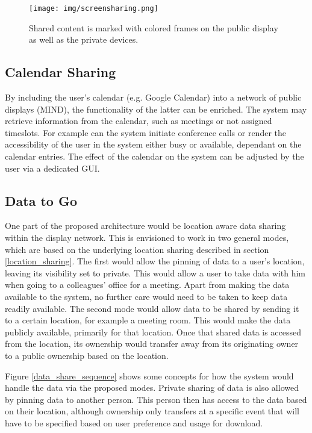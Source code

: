 \begin{figure}
	\centering
	\texttt{[image: img/screensharing.png]}
	\caption[Screen Sharing]{Shared content is marked with colored frames on the public display as well as the private devices.}
	\label{screen_sharing}
\end{figure}

\subsection{Calendar Sharing}

By including the user’s calendar (e.g. Google Calendar) into a network of public displays (MIND), the functionality of the latter can be enriched.
The system may retrieve information from the calendar, such as meetings or not assigned timeslots.
For example can the system initiate conference calls or render the accessibility of the user in the system either busy or available, dependant on the calendar entries.
The effect of the calendar on the system can be adjusted by the user via a dedicated GUI.

\subsection{Data to Go}
\label{data2go}

One part of the proposed architecture would be location aware data sharing within the display network.
This is envisioned to work in two general modes, which are based on the underlying location sharing described in section \ref{location_sharing}.
The first would allow the pinning of data to a user's location, leaving its visibility set to private.
This would allow a user to take data with him when going to a colleagues' office for a meeting.
Apart from making the data available to the system, no further care would need to be taken to keep data readily available.
The second mode would allow data to be shared by sending it to a certain location, for example a meeting room.
This would make the data publicly available, primarily for that location.
Once that shared data is accessed from the location, its ownership would transfer away from its originating owner to a public ownership based on the location.

Figure \ref{data_share_sequence} shows some concepts for how the system would handle the data via the proposed modes.
Private sharing of data is also allowed by pinning data to another person.
This person then has access to the data based on their location, although ownership only transfers at a specific event that will have to be specified based on user preference and usage for download.


